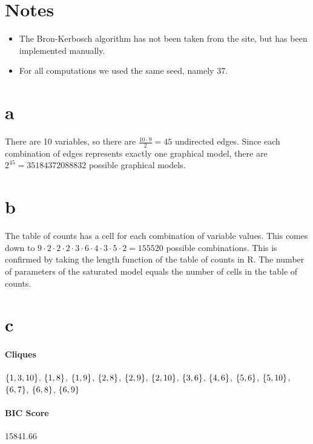 \documentclass[12pt]{article}
\theoremstyle{definition}
\begin{document}
\maketitle

\section*{Notes}
\begin{itemize}
    \item The Bron-Kerbosch algorithm has not been taken from the site, but has been implemented manually.
    \item For all computations we used the same seed, namely 37.
\end{itemize}

\section*{a}
There are 10 variables, so there are $\frac{10 \cdot 9}{2} = 45$ undirected edges.
Since each combination of edges represents exactly one graphical model,
there are $2^{45} = 35184372088832$ possible graphical models.

\section*{b}
The table of counts has a cell for each combination of variable values.
This comes down to $9 \cdot 2 \cdot 2 \cdot 2 \cdot 3 \cdot 6 \cdot 4 \cdot 3 \cdot 5 \cdot 2 = 155520$ possible combinations.
This is confirmed by taking the length function of the table of counts in R.
The number of parameters of the saturated model equals the number of cells in the table of counts.

\section*{c}
\paragraph{Cliques}
$\set{1,3,10}$, $\set{1,8}$, $\set{1,9}$, $\set{2,8}$, $\set{2,9}$, $\set{2,10}$, $\set{3,6}$,
$\set{4,6}$, $\set{5,6}$, $\set{5,10}$, $\set{6,7}$, $\set{6,8}$, $\set{6, 9}$

\paragraph{BIC Score} 15841.66
\end{document}
